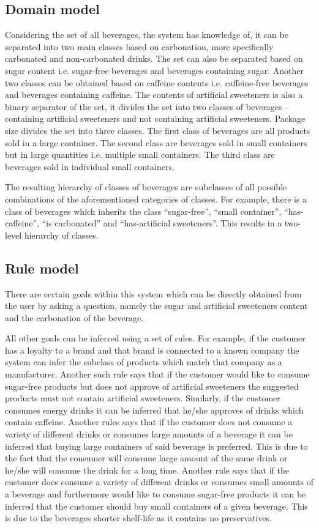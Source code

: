 \documentclass[11pt,a4paper]{article}
\begin{document}
\subsection{Domain model}

Considering the set of all beverages, the system has knowledge of, it can be separated into two main classes based on carbonation, more specifically carbonated and non-carbonated drinks. The set can also be separated based on sugar content i.e. sugar-free beverages and beverages containing sugar. Another two classes can be obtained based on caffeine contents i.e. caffeine-free beverages and beverages containing caffeine. The contents of artificial sweeteners is also a binary separator of the set, it divides the set into two classes of beverages -- containing artificial sweeteners and not containing artificial sweeteners. Package size divides the set into three classes. The first class of beverages are all products sold in a large container. The second class are beverages sold in small containers but in large quantities i.e. multiple small containers. The third class are beverages sold in individual small containers.

The resulting hierarchy of classes of beverages are subclasses of all possible combinations of the aforementioned categories of classes. For example, there is a class of beverages which inherits the class ``sugar-free'', ``small container'', ``has-caffeine'', ``is carbonated'' and ``has-artificial sweeteners''. This results in a two-level hierarchy of classes.

\subsection{Rule model}

There are certain goals within this system which can be directly obtained from the user by asking a question, namely the sugar and artificial sweeteners content and the carbonation of the beverage. 

All other goals can be inferred using a set of rules. For example, if the customer has a loyalty to a brand and that brand is connected to a known company the system can infer the subclass of products which match that company as a manufacturer. Another such rule says that if the customer would like to consume sugar-free products but does not approve of artificial sweeteners the suggested products must not contain artificial sweeteners. Similarly, if the customer consumes energy drinks it can be inferred that he/she approves of drinks which contain caffeine. Another rules says that if the customer does not consume a variety of different drinks or consumes large amounts of a beverage it can be inferred that buying large containers of said beverage is preferred. This is due to the fact that the consumer will consume large amount of the same drink or he/she will consume the drink for a long time. Another rule says that if the customer does consume a variety of different drinks
or consumes small amounts of a beverage and furthermore would like to consume sugar-free products it can be inferred that the customer should buy small containers of a given beverage. This is due to the beverages shorter shelf-life as it contains no preservatives.
\end{document}
